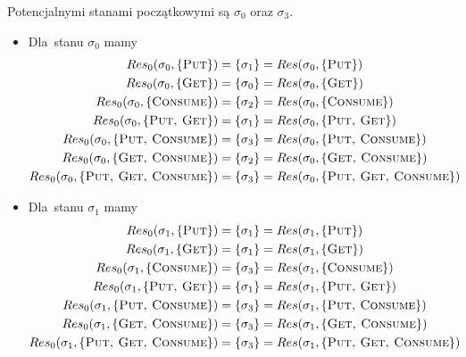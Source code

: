 \documentclass[11pt,a4paper]{article}
\begin{document}
Potencjalnymi stanami początkowymi są $\sigma_0$ oraz $\sigma_3$.

\begin{itemize}
    \item Dla~stanu $\sigma_0$ mamy
    \begin{align*}
        Res_0(\sigma_0, \{ \textsc{Put} \}) &= \{ \sigma_1 \} = Res(\sigma_0, \{ \textsc{Put} \}) \\
        Res_0(\sigma_0, \{ \textsc{Get} \}) &= \{ \sigma_0 \} = Res(\sigma_0, \{ \textsc{Get} \}) \\
        Res_0(\sigma_0, \{ \textsc{Consume} \}) &= \{ \sigma_2 \} = Res(\sigma_0, \{ \textsc{Consume} \}) \\
        Res_0(\sigma_0, \{ \textsc{Put, Get} \}) &= \{ \sigma_1 \} = Res(\sigma_0, \{ \textsc{Put, Get} \}) \\
        Res_0(\sigma_0, \{ \textsc{Put, Consume} \}) &= \{ \sigma_3 \} = Res(\sigma_0, \{ \textsc{Put, Consume} \}) \\
        Res_0(\sigma_0, \{ \textsc{Get, Consume} \}) &= \{ \sigma_2 \} = Res(\sigma_0, \{ \textsc{Get, Consume} \}) \\
        Res_0(\sigma_0, \{ \textsc{Put, Get, Consume} \}) &= \{ \sigma_3 \} = Res(\sigma_0, \{ \textsc{Put, Get, Consume} \})
    \end{align*}
    
    \item Dla~stanu $\sigma_1$ mamy
    \begin{align*}
        Res_0(\sigma_1, \{ \textsc{Put} \}) &= \{ \sigma_1 \} = Res(\sigma_1, \{ \textsc{Put} \}) \\
        Res_0(\sigma_1, \{ \textsc{Get} \}) &= \{ \sigma_1 \} = Res(\sigma_1, \{ \textsc{Get} \}) \\
        Res_0(\sigma_1, \{ \textsc{Consume} \}) &= \{ \sigma_3 \} = Res(\sigma_1, \{ \textsc{Consume} \}) \\
        Res_0(\sigma_1, \{ \textsc{Put, Get} \}) &= \{ \sigma_1 \} = Res(\sigma_1, \{ \textsc{Put, Get} \}) \\
        Res_0(\sigma_1, \{ \textsc{Put, Consume} \}) &= \{ \sigma_3 \} = Res(\sigma_1, \{ \textsc{Put, Consume} \}) \\
        Res_0(\sigma_1, \{ \textsc{Get, Consume} \}) &= \{ \sigma_3 \} = Res(\sigma_1, \{ \textsc{Get, Consume} \}) \\
        Res_0(\sigma_1, \{ \textsc{Put, Get, Consume} \}) &= \{ \sigma_3 \} = Res(\sigma_1, \{ \textsc{Put, Get, Consume} \})
    \end{align*}
    

\end{itemize}
\end{document}
